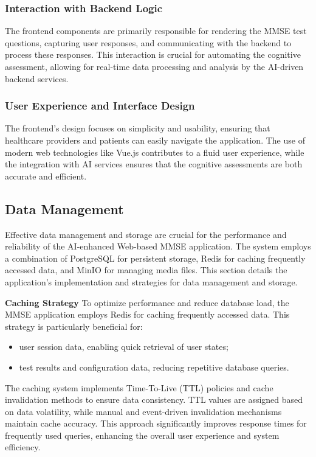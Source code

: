 \subsubsection{Interaction with Backend Logic}
The frontend components are primarily responsible for rendering the MMSE test questions, capturing user responses, and communicating with the backend to process these responses. This interaction is crucial for automating the cognitive assessment, allowing for real-time data processing and analysis by the AI-driven backend services.

\subsubsection{User Experience and Interface Design}
The frontend's design focuses on simplicity and usability, ensuring that healthcare providers and patients can easily navigate the application. The use of modern web technologies like Vue.js contributes to a fluid user experience, while the integration with AI services ensures that the cognitive assessments are both accurate and efficient.

\subsection{Data Management}
Effective data management and storage are crucial for the performance and reliability of the AI-enhanced Web-based MMSE application. The system employs a combination of PostgreSQL for persistent storage, Redis for caching frequently accessed data, and MinIO for managing media files. This section details the application's implementation and strategies for data management and storage.

\textbf{Caching Strategy}
To optimize performance and reduce database load, the MMSE application employs Redis for caching frequently accessed data. This strategy is particularly beneficial for:
\begin{itemize}
\item user session data, enabling quick retrieval of user states;
\item test results and configuration data, reducing repetitive database queries.
\end{itemize}
The caching system implements Time-To-Live (TTL) policies and cache invalidation methods to ensure data consistency. TTL values are assigned based on data volatility, while manual and event-driven invalidation mechanisms maintain cache accuracy.
This approach significantly improves response times for frequently used queries, enhancing the overall user experience and system efficiency.

